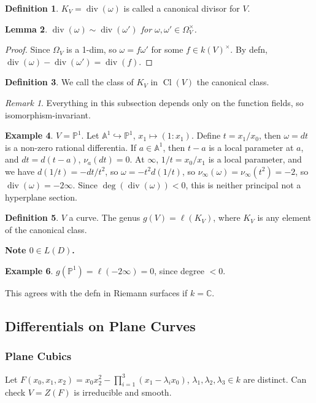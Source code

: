 \documentclass{article}
\theoremstyle{definition}
\newtheorem{defn}{Definition}[section]
\newtheorem{example}[defn]{Example}
\theoremstyle{remark}
\newtheorem{rem}{Remark}
\theoremstyle{plain}
\newtheorem{lem}[defn]{Lemma}
\newcommand{\CC}{\mathbb{C}}
\newcommand{\PP}{\mathbb{P}}
\newcommand{\bA}{\mathbb{A}}
\newcommand{\cl}{\operatorname{Cl}}
\newcommand{\divi}{\operatorname{div}}
\begin{document}
\begin{defn}
    $K_V=\divi(\omega)$ is called a canonical divisor for $V$.
\end{defn}
\begin{lem}
    $\divi(\omega)\sim\divi(\omega')$ for $\omega,\omega'\in\Omega_V^\times$.
\end{lem}
\begin{proof}
    Since $\Omega_V$ is a 1-dim, so $\omega=f\omega'$ for some $f\in k(V)^\times$. By defn, $\divi(\omega)-\divi(\omega')=\divi(f)$.
\end{proof}
\begin{defn}
    We call the class of $K_V$ in $\cl(V)$ the canonical class.
\end{defn}
\begin{rem}
    Everything in this subsection depends only on the function fields, so isomorphism-invariant.
\end{rem}
\begin{example}
    $V=\PP^1$. Let $\bA^1\hookrightarrow\PP^1$, $x_1\mapsto (1:x_1)$. Define $t=x_1/x_0$, then $\omega=dt$ is a non-zero rational differentia. If $a\in \bA^1$, then $t-a$ is a local parameter at $a$, and $dt=d(t-a)$, $\nu_a(dt)=0$. At $\infty$, $1/t=x_0/x_1$ is a local parameter, and we have $d(1/t)=-dt/t^2$, so $\omega=-t^2d(1/t)$, so $\nu_\infty(\omega)=\nu_\infty(t^2)=-2$, so $\divi(\omega)=-2\infty$. Since $\deg(\divi(\omega))<0$, this is neither principal not a hyperplane section.
\end{example}
\begin{defn}
    $V$ a curve. The genus $g(V)=\ell(K_V)$, where $K_V$ is any element of the canonical class.
\end{defn}
\textbf{Note $0\in L(D)$.}
\begin{example}
    $g(\PP^1)=\ell(-2\infty)=0$, since degree $<0$.
\end{example}
This agrees with the defn in Riemann surfaces if $k=\CC$.
\subsection{Differentials on Plane Curves}
\subsubsection{Plane Cubics}
Let $F(x_0,x_1,x_2)=x_0x_2^2-\prod_{i=1}^3(x_1-\lambda_ix_0)$, $\lambda_1,\lambda_2,\lambda_3\in k$ are distinct. Can check $V=Z(F)$ is irreducible and smooth.
\end{document}
